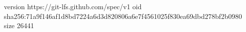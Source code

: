 version https://git-lfs.github.com/spec/v1
oid sha256:71a9f146af1d8bd7224a6d3d820806a6e7f4561025f830ea69dbd278bf2b0980
size 26441
